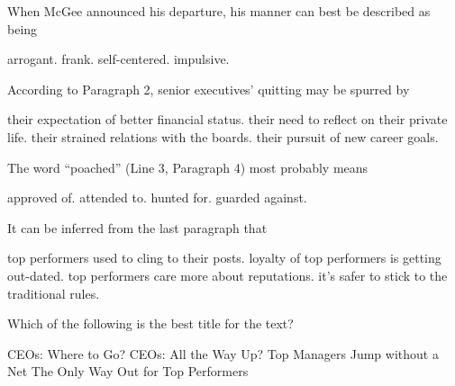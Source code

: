 \item When McGee announced his departure, his manner can best be described as being
\begin{tasks}
	\task arrogant.
	\task frank.
	\task self-centered.
	\task impulsive.
\end{tasks}
\item According to Paragraph 2, senior executives' quitting may be spurred by
\begin{tasks}
	\task their expectation of better financial status.
	\task their need to reflect on their private life.
	\task their strained relations with the boards.
	\task their pursuit of new career goals.
\end{tasks}
\item The word ``poached'' (Line 3, Paragraph 4) most probably means
\begin{tasks}
	\task approved of.
	\task attended to.
	\task hunted for.
	\task guarded against.
\end{tasks}
\item It can be inferred from the last paragraph that
\begin{tasks}
	\task top performers used to cling to their posts.
	\task loyalty of top performers is getting out-dated.
	\task top performers care more about reputations.
	\task it's safer to stick to the traditional rules.
\end{tasks}
\item Which of the following is the best title for the text?
\begin{tasks}
	\task CEOs: Where to Go?
	\task CEOs: All the Way Up?
	\task Top Managers Jump without a Net
	\task The Only Way Out for Top Performers
\end{tasks}